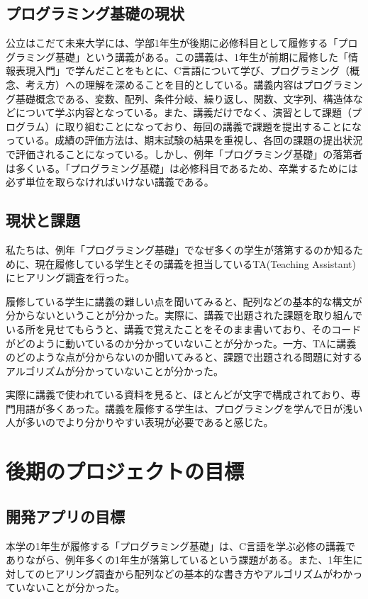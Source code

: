 \documentclass[openany,11pt,papersize]{jsbook}
\begin{document}
\section{プログラミング基礎の現状}
\par 公立はこだて未来大学には、学部1年生が後期に必修科目として履修する「プログラミング基礎」という講義がある。この講義は、1年生が前期に履修した「情報表現入門」で学んだことをもとに、C言語について学び、プログラミング（概念、考え方）への理解を深めることを目的としている。講義内容はプログラミング基礎概念である、変数、配列、条件分岐、繰り返し、関数、文字列、構造体などについて学ぶ内容となっている。また、講義だけでなく、演習として課題（プログラム）に取り組むことになっており、毎回の講義で課題を提出することになっている。成績の評価方法は、期末試験の結果を重視し、各回の課題の提出状況で評価されることになっている。しかし、例年「プログラミング基礎」の落第者は多くいる。「プログラミング基礎」は必修科目であるため、卒業するためには必ず単位を取らなければいけない講義である。

\section{現状と課題}
\par 私たちは、例年「プログラミング基礎」でなぜ多くの学生が落第するのか知るために、現在履修している学生とその講義を担当しているTA(Teaching Assistant)にヒアリング調査を行った。
\par 履修している学生に講義の難しい点を聞いてみると、配列などの基本的な構文が分からないということが分かった。実際に、講義で出題された課題を取り組んでいる所を見せてもらうと、講義で覚えたことをそのまま書いており、そのコードがどのように動いているのか分かっていないことが分かった。一方、TAに講義のどのような点が分からないのか聞いてみると、課題で出題される問題に対するアルゴリズムが分かっていないことが分かった。
\par 実際に講義で使われている資料を見ると、ほとんどが文字で構成されており、専門用語が多くあった。講義を履修する学生は、プログラミングを学んで日が浅い人が多いのでより分かりやすい表現が必要であると感じた。



\chapter{後期のプロジェクトの目標}

\section{開発アプリの目標}
本学の1年生が履修する「プログラミング基礎」は、C言語を学ぶ必修の講義でありながら、例年多くの1年生が落第しているという課題がある。また、1年生に対してのヒアリング調査から配列などの基本的な書き方やアルゴリズムがわかっていないことが分かった。
\end{document}
